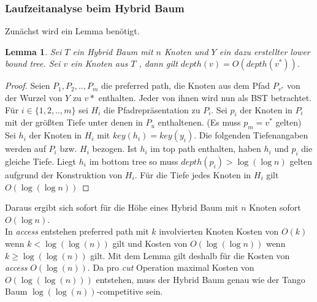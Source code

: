 \documentclass[a4paper,12pt]{article}
\begin{document}
\subsubsection{Laufzeitanalyse beim Hybrid Baum}
Zunächst wird ein Lemma benötigt.
\newtheorem{Lemma5}{Lemma}[section] 
\begin{Lemma5} \label{hybridBalanced}
Sei $T$ ein Hybrid Baum mit $n$ Knoten und $Y$ ein dazu erstellter lower bound tree. Sei $v$ ein Knoten aus $T$ , dann gilt $\mathit{depth}\left(v\right) = O\left(\mathit{depth\left(v^*\right)}\right)$.
\end{Lemma5}
\begin{proof}
Seien $P_1, P_2,.., P_m$ die preferred path, die Knoten aus dem Pfad $P_{v^*}$ von der Wurzel von $Y$ zu $v*$ enthalten. Jeder von ihnen wird nun als BST betrachtet. Für $i \in \{1, 2,..,m\}$ sei $H_i$ die Pfadrepräsentation zu $P_i$. Sei $p_i$ der Knoten in $P_i$ mit der größten Tiefe unter denen in $P_u$ enthaltenen. (Es muss $p_m = v^*$ gelten) Sei $h_i$ der Knoten in $H_i$ mit $\mathit{key}\left(h_i\right) = \mathit{key}\left(y_i\right)$. Die folgenden Tiefenangaben werden auf $P_i$ bzw. $H_i$ bezogen. Ist $h_i$ im top path enthalten, haben $h_i$ und $p_i$ die gleiche Tiefe. Liegt $h_i$ im bottom tree so muss $\mathit{depth}\left(p_i\right) > \log\left(\log n\right)$ gelten aufgrund der Konstruktion von $H_i$. Für die Tiefe jedes Knoten in $H_i$ gilt $O\left(\log\left(\log n\right)\right)$    
	
\end{proof}
\noindent Daraus ergibt sich sofort für die Höhe eines Hybrid Baum mit $n$ Knoten sofort $O\left(\log n\right)$. \\
In \textit{access} entstehen preferred path mit $k$ involvierten Knoten Kosten von $O\left(k\right)$ wenn $k < \log\left(\log\left(n\right)\right)$ gilt und Kosten von $O\left(\log\left(\log n\right)\right)$  wenn $k \geq \log\left(\log\left(n\right)\right)$ gilt. Mit dem Lemma gilt deshalb für die Kosten von \textit{access} $O\left(\log\left(n\right)\right)$. Da pro \textit{cut} Operation maximal Kosten von $O\left(\log\left(\log\left(n\right)\right)\right)$ entstehen, muss der Hybrid Baum genau wie der Tango Baum $\log \left(\log\left(n\right)\right)$-competitive sein.
\end{document}
